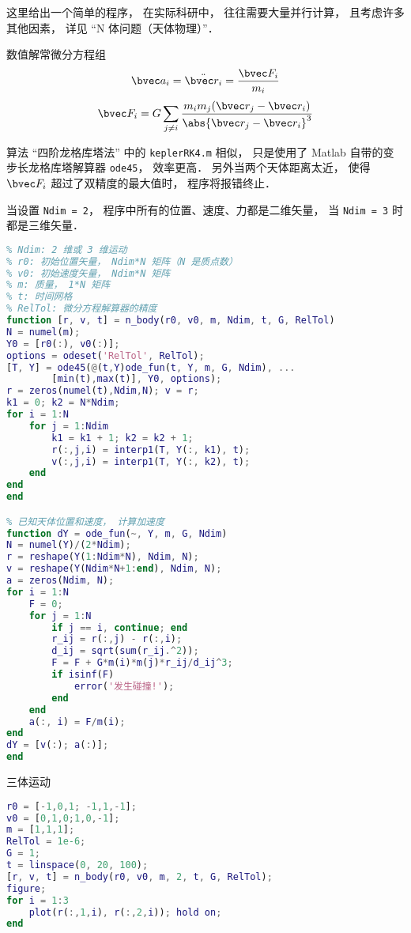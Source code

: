 
\begin{issues}
\issueDraft
\end{issues}


这里给出一个简单的程序， 在实际科研中， 往往需要大量并行计算， 且考虑许多其他因素， 详见 “N 体问题（天体物理）”．

数值解常微分方程组
\begin{equation}
\bvec a_i = \ddot{\bvec r_i} = \frac{\bvec F_i}{m_i}
\end{equation}
\begin{equation}
\bvec F_i = G\sum_{j\ne i} \frac{m_i m_j(\bvec r_j - \bvec r_i)}{\abs{\bvec r_j - \bvec r_i}^3}
\end{equation}

算法 “四阶龙格库塔法” 中的 \verb|keplerRK4.m| 相似， 只是使用了 Matlab 自带的变步长龙格库塔解算器 \verb|ode45|， 效率更高． 另外当两个天体距离太近， 使得 $\bvec F_i$ 超过了双精度的最大值时， 程序将报错终止．

当设置 \verb|Ndim = 2|， 程序中所有的位置、速度、力都是二维矢量， 当 \verb|Ndim = 3| 时都是三维矢量．


\begin{lstlisting}[language=matlab, caption=n\_body.m]
% N 体问题（支持二维或三维）
% Ndim: 2 维或 3 维运动
% r0: 初始位置矢量， Ndim*N 矩阵（N 是质点数）
% v0: 初始速度矢量， Ndim*N 矩阵
% m: 质量， 1*N 矩阵
% t: 时间网格
% RelTol: 微分方程解算器的精度
function [r, v, t] = n_body(r0, v0, m, Ndim, t, G, RelTol)
N = numel(m);
Y0 = [r0(:), v0(:)];
options = odeset('RelTol', RelTol);
[T, Y] = ode45(@(t,Y)ode_fun(t, Y, m, G, Ndim), ...
        [min(t),max(t)], Y0, options);
r = zeros(numel(t),Ndim,N); v = r;
k1 = 0; k2 = N*Ndim;
for i = 1:N
    for j = 1:Ndim
        k1 = k1 + 1; k2 = k2 + 1;
        r(:,j,i) = interp1(T, Y(:, k1), t);
        v(:,j,i) = interp1(T, Y(:, k2), t);
    end
end
end

% 已知天体位置和速度， 计算加速度
function dY = ode_fun(~, Y, m, G, Ndim)
N = numel(Y)/(2*Ndim);
r = reshape(Y(1:Ndim*N), Ndim, N);
v = reshape(Y(Ndim*N+1:end), Ndim, N);
a = zeros(Ndim, N);
for i = 1:N
    F = 0;
    for j = 1:N
        if j == i, continue; end
        r_ij = r(:,j) - r(:,i);
        d_ij = sqrt(sum(r_ij.^2));
        F = F + G*m(i)*m(j)*r_ij/d_ij^3;
        if isinf(F)
            error('发生碰撞!');
        end
    end
    a(:, i) = F/m(i);
end
dY = [v(:); a(:)];
end
\end{lstlisting}

三体运动
\begin{lstlisting}[language=matlab, caption=three\_body.m]
r0 = [-1,0,1; -1,1,-1];
v0 = [0,1,0;1,0,-1];
m = [1,1,1];
RelTol = 1e-6;
G = 1;
t = linspace(0, 20, 100);
[r, v, t] = n_body(r0, v0, m, 2, t, G, RelTol);
figure;
for i = 1:3
    plot(r(:,1,i), r(:,2,i)); hold on;
end
\end{lstlisting}
